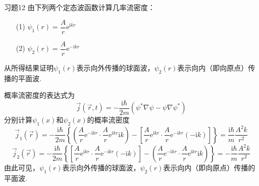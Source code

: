 \begin{question}{习题12}
    由下列两个定态波函数计算几率流密度：
    \begin{enumerate}
        \item[(1)] $\psi_1(r)=\dfrac{A}{r}\mathrm{e}^{\mathrm{i}kr}$
        \item[(2)] $\psi_2(r)=\dfrac{A}{r}\mathrm{e}^{-\mathrm{i}kr}$
    \end{enumerate}
    从所得结果证明$\psi_1(r)$表示向外传播的球面波，$\psi_2(r)$表示向内（即向原点）传播的平面波.
\end{question}
\begin{solution}
    概率流密度的表达式为
    \begin{equation}\label{概率流密度}
        \vec{j}(\vec{r}, t) = -\frac{\mathrm{i}\hbar}{2m}\left(\psi^*\nabla\psi-\psi\nabla\psi^*\right)
    \end{equation}
    分别计算$\psi_1(x)$和$\psi_2(x)$的概率流密度
    $$
        \vec{j}_1(\vec{r}) = -\frac{\mathrm{i}\hbar}{2m}\left\{\left(\frac{A}{r}\mathrm{e}^{-\mathrm{i}kr}\cdot\frac{A}{r}\mathrm{e}^{\mathrm{i}kr}\mathrm{i}k\right) - \left[\frac{A}{r}\mathrm{e}^{\mathrm{i}kr}\cdot\frac{A}{r}\mathrm{e}^{-\mathrm{i}kr}(-\mathrm{i}k)\right]\right\}
        =\frac{\mathrm{i}\hbar}{m}\frac{A^2k}{r^2}
    $$
    $$
        \vec{j}_2(\vec{r}) = -\frac{\mathrm{i}\hbar}{2m}\left\{\left[\frac{A}{r}\mathrm{e}^{\mathrm{i}kr}\cdot\frac{A}{r}\mathrm{e}^{-\mathrm{i}kr}(-\mathrm{i}k)\right]-\left(\frac{A}{r}\mathrm{e}^{-\mathrm{i}kr}\cdot\frac{A}{r}\mathrm{e}^{\mathrm{i}kr}\mathrm{i}k\right)\right\}
        =-\frac{\mathrm{i}\hbar}{m}\frac{A^2k}{r^2}
    $$
    由此可见，$\psi_1(r)$表示向外传播的球面波，$\psi_2(r)$表示向内（即向原点）传播的平面波.
\end{solution}
